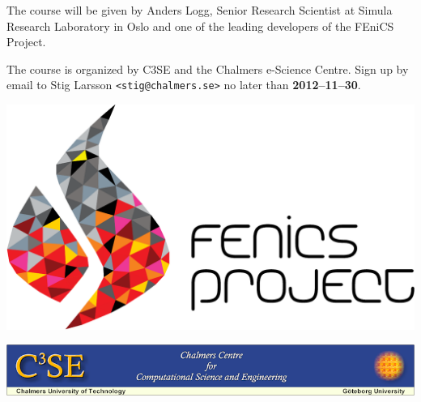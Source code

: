 \documentclass{article}
\begin{document}
\noindent
\begin{minipage}{0.6\textwidth}
  The course will be given by Anders Logg, Senior Research Scientist
  at Simula Research Laboratory in Oslo and one of the leading
  developers of the FEniCS Project.

  \bigskip
  The course is organized by C3SE and the Chalmers e-Science Centre.
  Sign up by email to Stig Larsson \texttt{<stig@chalmers.se>} no later
  than \textbf{2012--11--30}.
\end{minipage}
\hspace{0.5cm}
\begin{minipage}{0.35\textwidth}
  \includegraphics[width=\textwidth]{pdf/fenics_logo_text.pdf}
\end{minipage}
\vspace{0.5cm}

\noindent
\includegraphics[width=\textwidth]{png/C3SE_stretched.png}
\end{document}
